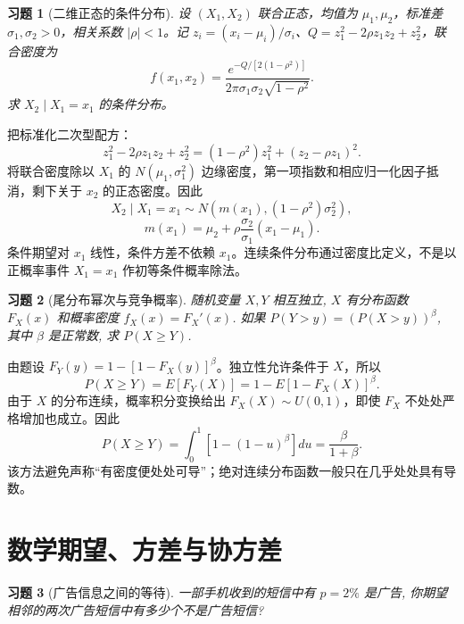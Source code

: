 \documentclass[12pt,fontset=fandol]{ctexart}
\newtheorem{exercise}{习题}[section]
\begin{document}
\begin{exercise}[二维正态的条件分布]\label{q:A4.28}
设 $(X_1,X_2)$ 联合正态，均值为 $\mu_1,\mu_2$，标准差 $\sigma_1,\sigma_2>0$，相关系数 $|\rho|<1$。记 $z_i=(x_i-\mu_i)/\sigma_i$、$Q=z_1^2-2\rho z_1z_2+z_2^2$，联合密度为\[f(x_1,x_2)=\frac{e^{-Q/[2(1-\rho^2)]}}{2\pi\sigma_1\sigma_2\sqrt{1-\rho^2}}.\]求 $X_2\mid X_1=x_1$ 的条件分布。\par{}
\end{exercise}

\begin{solve}\label{a:A4.28}把标准化二次型配方：\[z_1^2-2\rho z_1z_2+z_2^2=(1-\rho^2)z_1^2+(z_2-\rho z_1)^2.\]将联合密度除以 $X_1$ 的 $N(\mu_1,\sigma_1^2)$ 边缘密度，第一项指数和相应归一化因子抵消，剩下关于 $x_2$ 的正态密度。因此\[X_2\mid X_1=x_1\sim N(m(x_1),(1-\rho^2)\sigma_2^2),\]\[m(x_1)=\mu_2+\rho\frac{\sigma_2}{\sigma_1}(x_1-\mu_1).\]条件期望对 $x_1$ 线性，条件方差不依赖 $x_1$。连续条件分布通过密度比定义，不是以正概率事件 $X_1=x_1$ 作初等条件概率除法。\end{solve}

\begin{exercise}[尾分布幂次与竞争概率]\label{q:A4.32}
随机变量 $X,Y$ 相互独立, $X$ 有分布函数 $F_X(x)$ 和概率密度 $f_X(x)=F_X'(x)$. 如果 $P(Y>y)=(P(X>y))^\beta$, 其中 $\beta$ 是正常数, 求 $P(X\geq Y)$.\par{}
\end{exercise}

\begin{solve}\label{a:A4.32}由题设 $F_Y(y)=1-[1-F_X(y)]^\beta$。独立性允许条件于 $X$，所以\[P(X\ge Y)=E[F_Y(X)]=1-E[1-F_X(X)]^\beta.\]由于 $X$ 的分布连续，概率积分变换给出 $F_X(X)\sim U(0,1)$，即使 $F_X$ 不处处严格增加也成立。因此\[P(X\ge Y)=\int_0^1[1-(1-u)^\beta]du=\frac{\beta}{1+\beta}.\]该方法避免声称“有密度便处处可导”；绝对连续分布函数一般只在几乎处处具有导数。\end{solve}

\clearpage\section{数学期望、方差与协方差}

\begin{exercise}[广告信息之间的等待]\label{q:A5.5}
一部手机收到的短信中有 $p=2\%$ 是广告, 你期望相邻的两次广告短信中有多少个不是广告短信?\par{}
\end{exercise}
\end{document}
